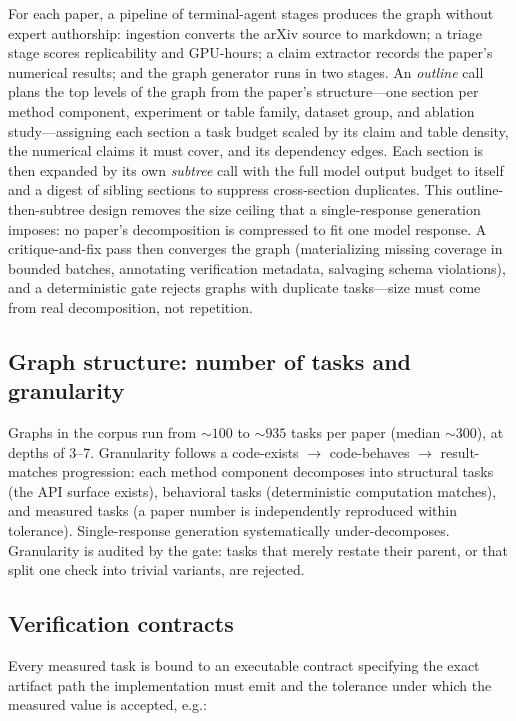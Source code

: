 \documentclass{article}
\begin{document}
For each paper, a pipeline of terminal-agent stages produces the graph
without expert authorship: ingestion converts the arXiv source to markdown; a
triage stage scores replicability and GPU-hours; a claim extractor records
the paper's numerical results; and the graph generator runs in two stages.
An \emph{outline} call plans the top levels of the graph from the paper's
structure---one section per method component, experiment or table family,
dataset group, and ablation study---assigning each section a task budget
scaled by its claim and table density, the numerical claims it must cover,
and its dependency edges. Each section is then expanded by its own
\emph{subtree} call with the full model output budget to itself and a digest
of sibling sections to suppress cross-section duplicates. This
outline-then-subtree design removes the size ceiling that a single-response
generation imposes: no paper's decomposition is compressed to fit one model
response. A critique-and-fix pass then converges the graph (materializing
missing coverage in bounded batches, annotating verification metadata,
salvaging schema violations), and a deterministic gate rejects graphs with
duplicate tasks---size must come from real decomposition, not repetition.

\subsection{Graph structure: number of tasks and granularity}

Graphs in the corpus run from ${\sim}100$ to ${\sim}935$ tasks per paper
(median ${\sim}300$), at depths of 3--7. Granularity follows a
code-exists $\rightarrow$ code-behaves $\rightarrow$ result-matches
progression: each method component decomposes into structural tasks (the API
surface exists), behavioral tasks (deterministic computation matches), and
measured tasks (a paper number is independently reproduced within tolerance).
Single-response generation systematically under-decomposes. Granularity is
audited by the gate: tasks that merely restate their parent, or that split
one check into trivial variants, are rejected.

\subsection{Verification contracts}

Every measured task is bound to an executable contract specifying the exact
artifact path the implementation must emit and the tolerance under which the
measured value is accepted, e.g.:
\end{document}

